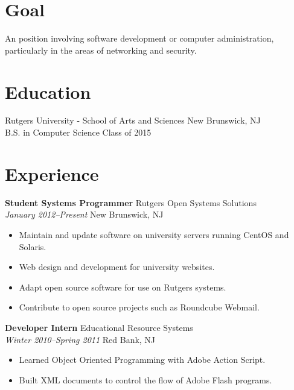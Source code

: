 \documentclass[margin]{res}
\begin{document}

\address{{\bf Present Address } \\ 2112 LPO Way \\ Piscataway, NJ 08854  \\
        phone : (732) 403 4073 }
\address{{\bf Permanent Address} \\ 153 Riveredge Road \\ Tinton Falls, NJ 07724\\
		email : jmatthews492@gmail.com }

\begin{resume}

\section{Goal}
An position involving software development or computer administration, particularly in the areas of networking and security.

\section{Education}

Rutgers University - School of Arts and Sciences \hfill New Brunswick, NJ\\
B.S. in Computer Science \hfill Class of 2015

\section{Experience}

{\bf Student Systems Programmer} \hfill Rutgers Open Systems Solutions\\
\textit{January 2012--Present} \hfill New Brunswick, NJ
\begin{itemize} \itemsep -2pt %
	\item Maintain and update software on university servers running CentOS and Solaris.
	\item Web design and development for university websites.
	\item Adapt open source software for use on Rutgers systems.
	\item Contribute to open source projects such as Roundcube Webmail.
\end{itemize}

{\bf Developer Intern} \hfill Educational Resource Systems\\
\textit{Winter 2010--Spring 2011} \hfill  Red Bank, NJ
\begin{itemize} \itemsep -2pt %
	\item Learned Object Oriented Programming with Adobe Action Script.
	\item Built XML documents to control the flow of Adobe Flash programs.
\end{itemize}


\end{resume}
\end{document}
